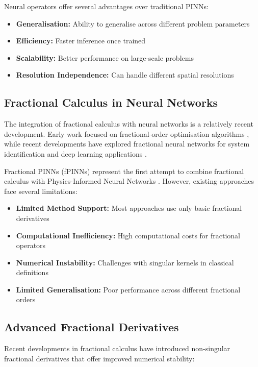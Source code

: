 \documentclass[12pt,a4paper]{article}
\theoremstyle{definition}
\begin{document}
Neural operators offer several advantages over traditional PINNs:
\begin{itemize}
    \item \textbf{Generalisation:} Ability to generalise across different problem parameters
    \item \textbf{Efficiency:} Faster inference once trained
    \item \textbf{Scalability:} Better performance on large-scale problems
    \item \textbf{Resolution Independence:} Can handle different spatial resolutions
\end{itemize}

\subsection{Fractional Calculus in Neural Networks}

The integration of fractional calculus with neural networks is a relatively recent development. Early work focused on fractional-order optimisation algorithms \citep{ahmad2018fractional,kumar2020fractional}, while recent developments have explored fractional neural networks for system identification \citep{chen2020fractional} and deep learning applications \citep{li2021fractional}.

Fractional PINNs (fPINNs) represent the first attempt to combine fractional calculus with Physics-Informed Neural Networks \citep{pang2019fpinns}. However, existing approaches face several limitations:

\begin{itemize}
    \item \textbf{Limited Method Support:} Most approaches use only basic fractional derivatives
    \item \textbf{Computational Inefficiency:} High computational costs for fractional operators
    \item \textbf{Numerical Instability:} Challenges with singular kernels in classical definitions
    \item \textbf{Limited Generalisation:} Poor performance across different fractional orders
\end{itemize}

\subsection{Advanced Fractional Derivatives}

Recent developments in fractional calculus have introduced non-singular fractional derivatives that offer improved numerical stability:
\end{document}
